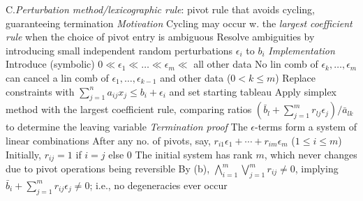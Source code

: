 \item{C.}\emph{Perturbation method/lexicographic rule}: pivot rule that avoids
cycling, guaranteeing termination\smallskip
{}\emph{Motivation}\smallskip
{}Cycling may occur w. the \emph{largest coefficient rule} when the
choice of pivot entry is ambiguous\smallskip
{}Resolve ambiguities by introducing small independent random
perturbations $\epsilon_i$ to $b_i$\smallskip
{}\emph{Implementation}\smallskip
{}Introduce (symbolic) $0\ll\epsilon_1\ll\ldots\ll\epsilon_m\ll$ all
other data\smallskip
{}No lin comb of $\epsilon_k,\ldots,\epsilon_m$ can cancel
a lin comb of $\epsilon_1,\ldots,\epsilon_{k-1}$ and other data
($0<k\leq m$)\smallskip
{}Replace constraints with $\sum_{j=1}^na_{ij}x_j\leq b_i+\epsilon_i$
and set starting tableau\smallskip
\iiitem{}\vbox{\offinterlineskip
}\smallskip
{}Apply simplex method with the largest coefficient rule, comparing
ratios $\left(\bar{b}_l+\sum_{j=1}^mr_{lj}\epsilon_j\right)/\bar{a}_{lk}$ to
determine the leaving variable\smallskip
{}\emph{Termination proof}\smallskip
{}The $\epsilon$-terms form a system of linear combinations\smallskip
{}After any no. of pivots, say, $r_{i1}\epsilon_1+\cdots+r_{im}\epsilon_m$ ($1\leq i\leq m$)\smallskip
{}Initially, $r_{ij}=1$ if $i=j$ else $0$\smallskip
{}The initial system has rank $m$, which never changes due to pivot
operations being reversible\smallskip
{}By (b), $\bigwedge_{i=1}^m\bigvee_{j=1}^m r_{ij}\not=0$, implying
$\bar{b}_i+\sum_{j=1}^mr_{ij}\epsilon_j\not=0$; i.e., no degeneracies ever
occur\smallskip


